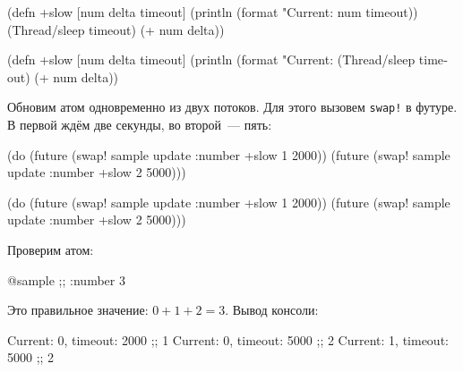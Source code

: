 \begin{english}
  \begin{clojure}
(defn +slow
  [num delta timeout]
  (println
    (format "Current: %
      num timeout))
  (Thread/sleep timeout)
  (+ num delta))
  \end{clojure}
\end{english}

\else

\begin{english}
  \begin{clojure}
(defn +slow
  [num delta timeout]
  (println (format "Current: %
  (Thread/sleep timeout)
  (+ num delta))
  \end{clojure}
\end{english}

\fi


Обновим атом одновременно из двух потоков. Для этого вызовем \verb|swap!| в
футуре. В первой ждём две секунды, во второй~--- пять:

\ifx\DEVICETYPE\MOBILE

\begin{english}
  \begin{clojure}
(do (future (swap! sample update
              :number +slow 1 2000))
    (future (swap! sample update
              :number +slow 2 5000)))
  \end{clojure}
\end{english}

\else

\begin{english}
  \begin{clojure}
(do (future (swap! sample update :number +slow 1 2000))
    (future (swap! sample update :number +slow 2 5000)))
  \end{clojure}
\end{english}

\fi

\noindent
Проверим атом:

\begin{english}
  \begin{clojure}
@sample ;; {:number 3}
  \end{clojure}
\end{english}

\noindent
Это правильное значение: $0 + 1 + 2 = 3$. Вывод консоли:

\begin{english}
  \begin{text}
Current: 0, timeout: 2000 ;; 1
Current: 0, timeout: 5000 ;; 2
Current: 1, timeout: 5000 ;; 2
  \end{text}
\end{english}


